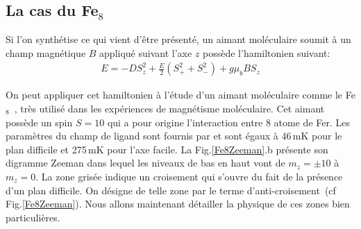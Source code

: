 \subsection{La cas du Fe$_8$}
Si l'on synthétise ce qui vient d'\^etre présenté, un aimant moléculaire soumit à un champ magnétique $B$ appliqué suivant l'axe $z$ possède l'hamiltonien suivant:
\begin{eqnarray}
E =  -DS_z^2 + \frac{E}{2} ( S_+^2  + S_-^2) + g\mu_b B S_z 
\end{eqnarray}


On peut appliquer cet hamiltonien à l'étude d'un aimant moléculaire comme le Fe$_8$~\cite{Barra1996}, très utilisé dans les expériences de magnétisme moléculaire. Cet aimant possède un spin $S=10$ qui a pour origine l'interaction entre 8 atome de Fer. Les paramètres du champ de ligand sont fournis par \cite{Barra1996} et sont égaux à 46\,mK pour le plan difficile et 275\,mK pour l'axe facile. La Fig.\ref{Fe8Zeeman}.b présente son digramme Zeeman dans lequel les niveaux  de bas en haut vont de $m_z=\pm10$ à $m_z=0$. La zone grisée indique un croisement qui s'ouvre du fait de la présence d'un plan difficile. On désigne de telle zone par le terme d'anti-croisement~(cf Fig.\ref{Fe8Zeeman}). Nous allons maintenant détailler la physique de ces zones bien particulières.
